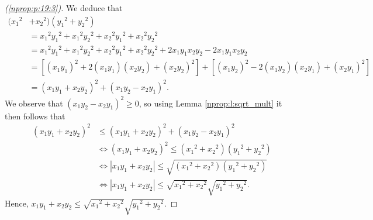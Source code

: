 \begin{proof}[(\ref{nprop:p:19:3})]
	We deduce that
	\begin{align*}
		(x_1{ }^2 & + x_2{ }^2)(y_1{ }^2 + y_2{ }^2)                                                                                                      \\
		          & = x_1{ }^2 y_1{ }^2 + x_1{ }^2 y_2{ }^2 + x_2{ }^2 y_1{ }^2 + x_2{ }^2 y_2{ }^2                                                       \\
		          & = x_1{ }^2 y_1{ }^2 + x_1{ }^2 y_2{ }^2 + x_2{ }^2 y_1{ }^2 + x_2{ }^2 y_2{ }^2 + 2 x_1 y_1 x_2 y_2 - 2 x_1 y_1 x_2 y_2               \\
		          & = \left[ (x_1 y_1)^2 + 2 (x_1 y_1) (x_2 y_2) + (x_2 y_2)^2 \right] + \left[ (x_1 y_2)^2 - 2 (x_1 y_2) (x_2 y_1) + (x_2 y_1)^2 \right] \\
		          & = (x_1 y_1 + x_2 y_2)^2 + (x_1 y_2 - x_2 y_1)^2.
	\end{align*}
	We observe that $(x_1 y_2 - x_2 y_1)^2 \geq 0$, so using Lemma \ref{nprop:l:sqrt_mult} it then follows that
	\begin{align*}
		(x_1 y_1 + x_2 y_2)^2 & \leq (x_1 y_1 + x_2 y_2)^2 + (x_1 y_2 - x_2 y_1)^2                                   \\
		                      & \iff (x_1 y_1 + x_2 y_2)^2 \leq (x_1{ }^2 + x_2{ }^2)(y_1{ }^2 + y_2{ }^2)           \\
		                      & \iff |x_1 y_1 + x_2 y_2| \leq \sqrt{(x_1{ }^2 + x_2{ }^2)(y_1{ }^2 + y_2{ }^2)}      \\
		                      & \iff |x_1 y_1 + x_2 y_2| \leq \sqrt{x_1{ }^2 + x_2{ }^2} \sqrt{y_1{ }^2 + y_2{ }^2}.
	\end{align*}
	Hence, $x_1 y_1 + x_2 y_2 \leq \sqrt{x_1{ }^2 + x_2{ }^2} \sqrt{y_1{ }^2 + y_2{ }^2}$.
\end{proof}

